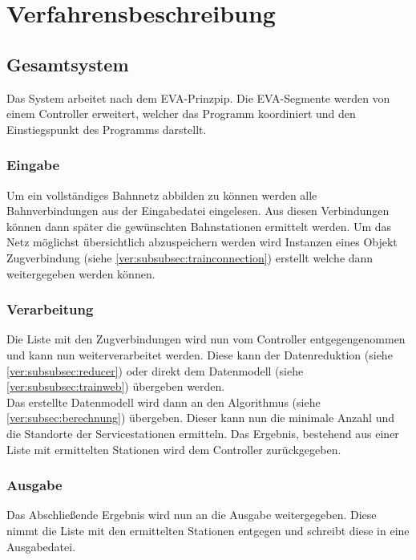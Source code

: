 \chapter{Verfahrensbeschreibung}\label{ch:verfahrensbeschreibung}


\section{Gesamtsystem}\label{ver:sec:gesamtsystem}
Das System arbeitet nach dem EVA-Prinzpip. Die EVA-Segmente werden von einem Controller erweitert, welcher das Programm koordiniert und den Einstiegspunkt des Programms darstellt.

\subsection{Eingabe}\label{ver:subsec:eingabe}
Um ein vollständiges Bahnnetz abbilden zu können werden alle Bahnverbindungen aus der Eingabedatei eingelesen. Aus diesen Verbindungen können dann später die gewünschten Bahnstationen ermittelt werden. Um das Netz möglichst übersichtlich abzuspeichern werden wird Instanzen eines Objekt Zugverbindung (siehe \ref{ver:subsubsec:trainconnection}) erstellt welche dann weitergegeben werden können.\\

\subsection{Verarbeitung}\label{subsec:verarbeitung}
Die Liste mit den Zugverbindungen wird nun vom Controller entgegengenommen und kann nun weiterverarbeitet werden. Diese kann der Datenreduktion (siehe \ref{ver:subsubsec:reducer}) oder direkt dem Datenmodell (siehe \ref{ver:subsubsec:trainweb}) übergeben werden. \\ Das erstellte Datenmodell wird dann an den Algorithmus (siehe \ref{ver:subsec:berechnung}) übergeben. Dieser kann nun die minimale Anzahl und die Standorte der Servicestationen ermitteln. Das Ergebnis, bestehend aus einer Liste mit ermittelten Stationen wird dem Controller zurückgegeben.\\


\subsection{Ausgabe}\label{ver:subsec:ausgabe}
Das Abschließende Ergebnis wird nun an die Ausgabe weitergegeben. Diese nimmt die Liste mit den ermittelten Stationen entgegen und schreibt diese in eine Ausgabedatei.\\

